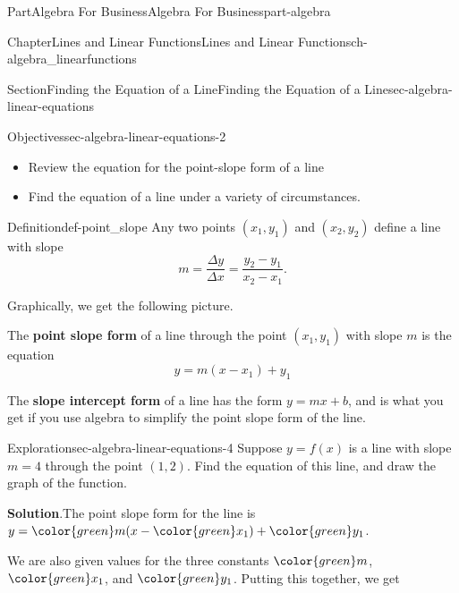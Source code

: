\documentclass[oneside,10pt,]{tufte-book}
\newcommand{\blocktitlefont}{\relax}
\newcommand{\terminology}[1]{\textbf{#1}}
\numberwithin{equation}{chapter}
\begin{document}
\begin{partptx}{Part}{Algebra For Business}{}{Algebra For Business}{}{}{part-algebra}
\begin{chapterptx}{Chapter}{Lines and Linear Functions}{}{Lines and Linear Functions}{}{}{ch-algebra_linearfunctions}
\begin{sectionptx}{Section}{Finding the Equation of a Line}{}{Finding the Equation of a Line}{}{}{sec-algebra-linear-equations}
\begin{objectives}{Objectives}{sec-algebra-linear-equations-2}
%
\begin{itemize}[label=\textbullet]
\item{}Review the equation for the point-slope form of a line%
\item{}Find the equation of a line under a variety of circumstances.%
\end{itemize}
\end{objectives}
\begin{definition}{Definition}{}{def-point_slope}%
Any two points \((x_1,y_1)\) and \((x_2,y_2)\) define a line with slope%
\begin{equation*}
m = \dfrac{\Delta y}{\Delta x} = \dfrac{y_2-y_1}{x_2-x_1}\text{.}
\end{equation*}
%
\par
Graphically, we get the following picture.%
\begin{image}{0.3}{0.4}{0.3}{}%
%
\end{image}%
The \terminology{point slope form} of a line through the point \((x_1,y_1)\) with slope \(m\) is the equation%
\begin{equation*}
y = m (x - x_1) + y_1
\end{equation*}
%
\par
The \terminology{slope intercept form} of a line has the form \(y = m x + b\), and is what you get if you use algebra to simplify the point slope form of the line.%
\end{definition}
\begin{exploration}{Exploration}{}{sec-algebra-linear-equations-4}%
Suppose \(y = f(x)\) is a line with slope \(m=4\) through the point \((1,2)\).  Find the equation of this line, and draw the graph of the function.%
\par\smallskip%
\noindent\textbf{\blocktitlefont Solution}.\hypertarget{sec-algebra-linear-equations-4-2}{}\quad{}The point slope form for the line is \(y = {\color{green} m} (x - { \color{green} x_1}) + {\color{green} y_1}\).%
\par
We are also given values for the three constants \(\color{green} m\), \(\color{green} x_1\), and \(\color{green} y_1\). Putting this together, we get%

\end{exploration}
\end{sectionptx}
\end{chapterptx}
\end{partptx}
\end{document}
